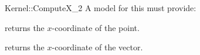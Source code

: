 \begin{ccRefFunctionObjectConcept}{Kernel::ComputeX_2}
A model for this must provide:


       {returns the $x$-coordinate of the point.}

       {returns the $x$-coordinate of the vector.}

\ccRefines
{}



\end{ccRefFunctionObjectConcept}
